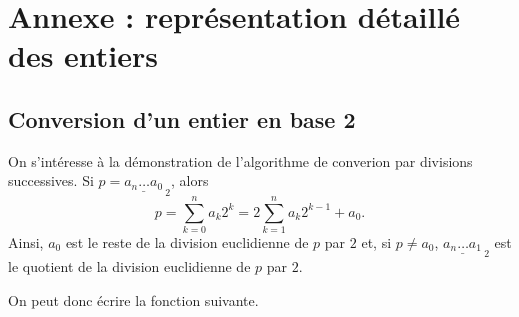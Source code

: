 %    


\section{Annexe : représentation détaillé des entiers}

\subsection{Conversion d'un entier en base 2}
\sloppy
On s'intéresse à la démonstration de l'algorithme de converion par divisions successives.
Si $p = \underline{a_n\dots a_0}_{~2}$, alors 
$$ p = \sum_{k=0}^n a_k 2^k = 2\sum_{k=1}^n a_k2^{k-1} + a_0.$$
Ainsi, $a_0$ est le reste de la division euclidienne de $p$ par $2$ et, si $p\neq a_0$, $\underline{a_n\dots a_1}_{~2}$ est le quotient de la division euclidienne de $p$ par $2$.

On peut donc écrire la fonction suivante.


